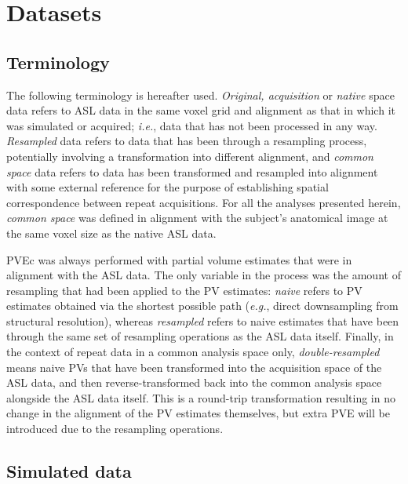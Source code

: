\section{Datasets}

\subsection{Terminology}

The following terminology is hereafter used. \textit{Original, acquisition} or \textit{native} space data refers to ASL data in the same voxel grid and alignment as that in which it was simulated or acquired; \textit{i.e.}, data that has not been processed in any way. \textit{Resampled} data refers to data that has been through a resampling process, potentially involving a transformation into different alignment, and \textit{common space} data refers to data has been transformed and resampled into alignment with some external reference for the purpose of establishing spatial correspondence between repeat acquisitions. For all the analyses presented herein, \textit{common space} was defined in alignment with the subject's anatomical image at the same voxel size as the native ASL data. 

PVEc was always performed with partial volume estimates that were in alignment with the ASL data. The only variable in the process was the amount of resampling that had been applied to the PV estimates: \textit{naive} refers to PV estimates obtained via the shortest possible path (\textit{e.g.}, direct downsampling from structural resolution), whereas \textit{resampled} refers to naive estimates that have been through the same set of resampling operations as the ASL data itself. Finally, in the context of repeat data in a common analysis space only, \textit{double-resampled} means naive PVs that have been transformed into the acquisition space of the ASL data, and then reverse-transformed back into the common analysis space alongside the ASL data itself. This is a round-trip transformation resulting in no change in the alignment of the PV estimates themselves, but extra PVE will be introduced due to the resampling operations. 

\subsection{Simulated data}
\label{pvec_chapter_sim_data}

